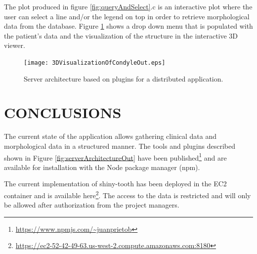 \documentclass[]{spie}  %
\begin{document}
The plot produced in figure \ref{fig:queryAndSelect}.c is an interactive plot where the user can select a line and/or the legend on top 
in order to retrieve morphological data from the database. Figure \ref{fig:3DVisualizationOfCondyle} shows a drop down menu that is populated 
with the patient's data and the visualization of the structure in the interactive 3D viewer.

\begin{figure}
	\centering 
	\texttt{[image: 3DVisualizationOfCondyleOut.eps]}
	\caption[Server architecture]{Server architecture based on plugins for a distributed application.}
	\label{fig:3DVisualizationOfCondyle}
\end{figure}

\section{CONCLUSIONS} 

The current state of the application allows gathering clinical data and morphological data in a structured manner. 
The tools and plugins described shown in Figure \ref{fig:serverArchitectureOut} have been published\footnote{\url{https://www.npmjs.com/~juanprietob}} and are available for installation with the Node package manager (npm). 

The current implementation of shiny-tooth has been deployed in the EC2 container and is available here\footnote{\url{https://ec2-52-42-49-63.us-west-2.compute.amazonaws.com:8180}}. The access to the data is restricted and will only be allowed after authorization from the project managers. 



\end{document}
